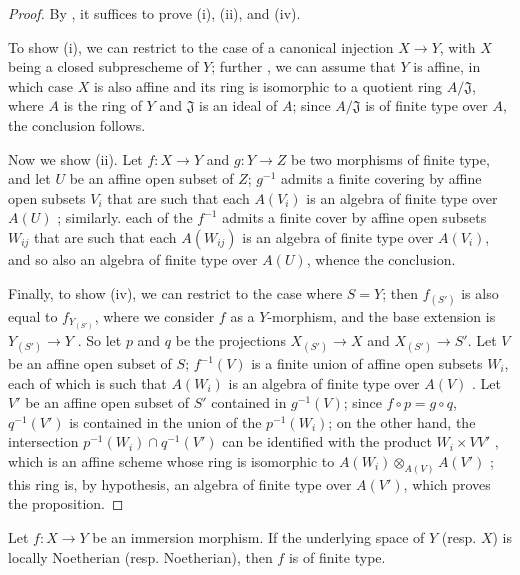 \begin{proof}
\label{proof-1.6.3.4}
By , it suffices to prove (i), (ii), and (iv).

To show (i), we can restrict to the case of a canonical injection $X\to Y$, with $X$ being a closed subprescheme of $Y$;
further , we can assume that $Y$ is affine, in which case $X$ is also affine  and its ring is isomorphic to a quotient ring $A/\mathfrak{J}$, where $A$ is the ring of $Y$ and $\mathfrak{J}$ is an ideal of $A$;
since $A/\mathfrak{J}$ is of finite type over $A$, the conclusion follows.

Now we show (ii).
Let $f:X\to Y$ and $g:Y\to Z$ be two morphisms of finite type, and let $U$ be an affine open subset of $Z$;
$g^{-1}$ admits a finite covering by affine open subsets $V_i$ that are such that each $A(V_i)$ is an algebra of finite type over $A(U)$ ;
similarly. each
of the $f^{-1}$ admits a finite cover by affine open subsets $W_{ij}$ that are such that each $A(W_{ij})$ is an algebra of finite type over $A(V_i)$, and so also an algebra of finite type over $A(U)$, whence the conclusion.

Finally, to show (iv), we can restrict to the case where $S=Y$;
then $f_{(S')}$ is also equal to $f_{Y_{(S')}}$, where we consider $f$ as a $Y$-morphism, and the base extension is $Y_{(S')}\to Y$ .
So let $p$ and $q$ be the projections $X_{(S')}\to X$ and $X_{(S')}\to S'$.
Let $V$ be an affine open subset of $S$;
$f^{-1}(V)$ is a finite union of affine open subsets $W_i$, each of which is such that $A(W_i)$ is an algebra of finite type over $A(V)$ .
Let $V'$ be an affine open subset of $S'$ contained in $g^{-1}(V)$;
since $f\circ p=g\circ q$, $q^{-1}(V')$ is contained in the union of the $p^{-1}(W_i)$;
on the other hand, the intersection $p^{-1}(W_i)\cap q^{-1}(V')$ can be identified with the product $W_i\times V V'$ , which is an affine scheme whose ring is isomorphic to $A(W_i)\otimes_{A(V)}A(V')$ ;
this ring is, by hypothesis, an algebra of finite type over $A(V')$, which proves the proposition.
\end{proof}

\begin{corollary}[6.3.5]
\label{I.6.3.5}
Let $f:X\to Y$ be an immersion morphism.
If the underlying space of $Y$ (resp. $X$) is locally Noetherian (resp. Noetherian), then $f$ is of finite type.
\end{corollary}

